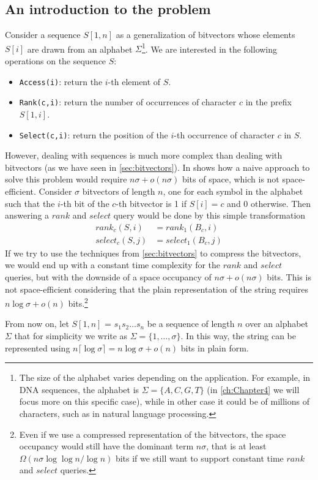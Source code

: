 \subsection*{An introduction to the problem}
Consider a sequence $S[1,n]$ as a generalization of bitvectors whose elements $S[i]$ are drawn from an alphabet $\Sigma$\footnote{The size of the alphabet varies depending on the application. For example, in DNA sequences, the alphabet is $\Sigma = \{A,C,G,T\}$ (in \autoref{ch:Chapter4} we will focus more on this specific case), while in other case it could be of millions of characters, such as in natural language processing.}. We are interested in the following operations on the sequence $S$:
\begin{itemize}
    \item \texttt{Access(i)}: return the $i$-th element of $S$.
    \item \texttt{Rank(c,i)}: return the number of occurrences of character $c$ in the prefix $S[1,i]$.
    \item \texttt{Select(c,i)}: return the position of the $i$-th occurrence of character $c$ in $S$.
\end{itemize}
However, dealing with sequences is much more complex than dealing with bitvectors (as we have seen in \autoref{sec:bitvectors}). In \cite{navarro2016compact} shows how a naive approach to solve this problem would require $n\sigma + o(n\sigma)$ bits of space, which is not space-efficient. Consider $\sigma$ bitvectors of length $n$, one for each symbol in the alphabet such that the $i$-th bit of the $c$-th bitvector is 1 if $S[i] = c$ and 0 otherwise. Then answering a $rank$ and $select$ query would be done by this simple transformation
\begin{align*}
    rank_c(S,i)   & = rank_1(B_c,i)   \\
    select_c(S,j) & = select_1(B_c,j)
\end{align*}
If we try to use the techniques from \autoref{sec:bitvectors} to compress the bitvectors, we would end up with a constant time complexity for the $rank$ and $select$ queries, but with the downside of a space occupancy of $n\sigma + o(n\sigma)$ bits. This is not space-efficient considering that the plain representation of the string requires $n\log \sigma + o(n)$ bits.\footnote{Even if we use a compressed representation of the bitvectors, the space occupancy would still have the dominant term $n\sigma$, that is at least $\Omega(n\sigma \log \log n / \log n)$ bits if we still want to support constant time $rank$ and $select$ queries.}
\begin{remark}[Notation]
    From now on, let $S[1,n]$ = $s_1s_2\dots s_n$ be a sequence of length $n$ over an alphabet $\Sigma$ that for simplicity we write as $\Sigma = \{1,\dots,\sigma\}$. In this way, the string can be represented using $n \lceil \log \sigma \rceil = n \log \sigma + o(n)$ bits in plain form.
\end{remark}

